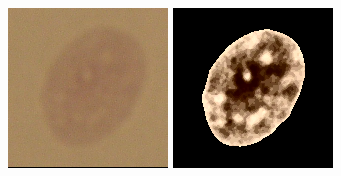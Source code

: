 \begin{figure}[t!]
	\includegraphics[width=0.95\linewidth]{Figures/Chapter2/7d1.png}
	\includegraphics[width=0.95\linewidth]{Figures/Chapter2/7d2.png}
	\endminipage\hfill
	\centering	

\end{figure}

